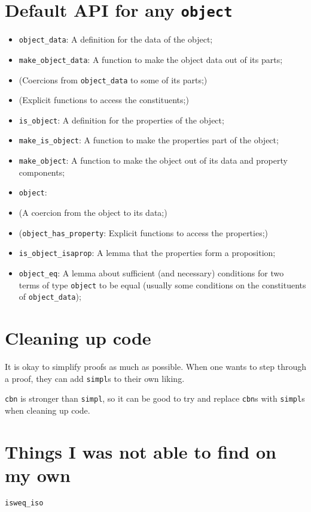 \documentclass{amsbook}
\theoremstyle{definition}
\begin{document}
  \section{Default API for any \texttt{object}}
  \begin{itemize}
    \item \texttt{object\_data}: A definition for the data of the object;
    \item \texttt{make\_object\_data}: A function to make the object data out of its parts;
    \item (Coercions from \texttt{object\_data} to some of its parts;)
    \item (Explicit functions to access the constituents;)
    \item \texttt{is\_object}: A definition for the properties of the object;
    \item \texttt{make\_is\_object}: A function to make the properties part of the object;
    \item \texttt{make\_object}: A function to make the object out of its data and property components;
    \item \texttt{object}:
    \item (A coercion from the object to its data;)
    \item (\texttt{object\_has\_property}: Explicit functions to access the properties;)
    \item \texttt{is\_object\_isaprop}: A lemma that the properties form a proposition;
    \item \texttt{object\_eq}: A lemma about sufficient (and necessary) conditions for two terms of type \texttt{object} to be equal (usually some conditions on the constituents of \texttt{object\_data});
  \end{itemize}

  \section{Cleaning up code}
  It is okay to simplify proofs as much as possible. When one wants to step through a proof, they can add \texttt{simpl}s to their own liking.

  \texttt{cbn} is stronger than \texttt{simpl}, so it can be good to try and replace \texttt{cbn}s with \texttt{simpl}s when cleaning up code.

  \section{Things I was not able to find on my own}
  \texttt{isweq\_iso}
\end{document}
